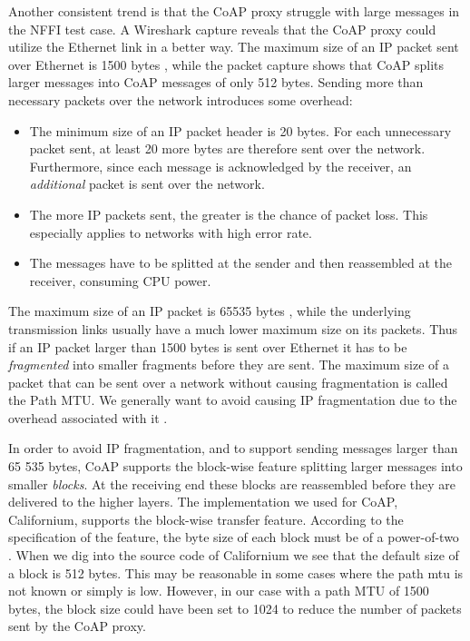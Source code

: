 Another consistent trend is that the CoAP proxy struggle with large messages in
the NFFI test case. A Wireshark capture reveals that the CoAP proxy could
utilize the Ethernet link in a better way. The maximum size of an IP packet sent
over Ethernet is 1500 bytes \cite{rfc-894}, while the packet capture shows that
CoAP splits larger messages into CoAP messages of only 512 bytes. Sending more
than necessary packets over the network introduces some overhead:

\begin{itemize}

    \item The minimum size of an IP packet header is 20 bytes. For each
    unnecessary packet sent, at least 20 more bytes are therefore sent over the
    network. Furthermore, since each message is acknowledged by the receiver, an
    \textit{additional} packet is sent over the network.

    \item The more IP packets sent, the greater is the chance of packet loss.
    This especially applies to networks with high error rate.

    \item The messages have to be splitted at the sender and then reassembled at
    the receiver, consuming CPU power.

\end{itemize}

The maximum size of an IP packet is 65535 bytes \cite{rfc-791}, while the underlying
transmission links usually have a much lower maximum size on its packets. Thus if
an IP packet larger than 1500 bytes is sent over Ethernet it has to be
\textit{fragmented} into smaller fragments before they are sent. The maximum
size of a packet that can be sent over a network without causing fragmentation
is called the Path MTU. We generally want to avoid causing IP fragmentation due
to the overhead associated with it \cite{genkov2006avoiding}.

In order to avoid IP fragmentation, and to support sending messages larger than
65 535 bytes, CoAP supports the block-wise feature splitting larger messages
into smaller \textit{blocks}. At the receiving end these blocks are reassembled
before they are delivered to the higher layers. The implementation we used for
CoAP, Californium, supports the block-wise transfer feature. According to the
specification of the feature, the byte size of each block must be of a
power-of-two \cite{draft-coap-blockwise}. When we dig into the source code of
Californium we see that the default size of a block is 512 bytes. This may be
reasonable in some cases where the path \gls{mtu} is not known or simply is low.
However, in our case with a path MTU of 1500 bytes, the block size could have
been set to 1024 to reduce the number of packets sent by the CoAP proxy.

